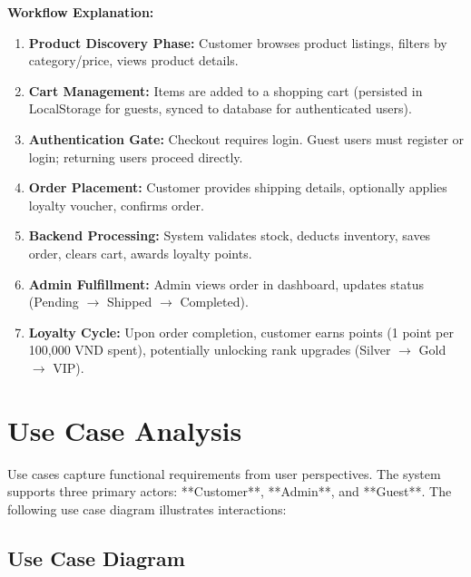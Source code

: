 \documentclass[12pt, a4paper]{report}
\begin{document}
\textbf{Workflow Explanation:}
\begin{enumerate}
    \item \textbf{Product Discovery Phase:} Customer browses product listings, filters by category/price, views product details.
    \item \textbf{Cart Management:} Items are added to a shopping cart (persisted in LocalStorage for guests, synced to database for authenticated users).
    \item \textbf{Authentication Gate:} Checkout requires login. Guest users must register or login; returning users proceed directly.
    \item \textbf{Order Placement:} Customer provides shipping details, optionally applies loyalty voucher, confirms order.
    \item \textbf{Backend Processing:} System validates stock, deducts inventory, saves order, clears cart, awards loyalty points.
    \item \textbf{Admin Fulfillment:} Admin views order in dashboard, updates status (Pending $\rightarrow$ Shipped $\rightarrow$ Completed).
    \item \textbf{Loyalty Cycle:} Upon order completion, customer earns points (1 point per 100,000 VND spent), potentially unlocking rank upgrades (Silver $\rightarrow$ Gold $\rightarrow$ VIP).
\end{enumerate}

\section{Use Case Analysis}

Use cases capture functional requirements from user perspectives. The system supports three primary actors: **Customer**, **Admin**, and **Guest**. The following use case diagram illustrates interactions:

\subsection{Use Case Diagram}
\end{document}
